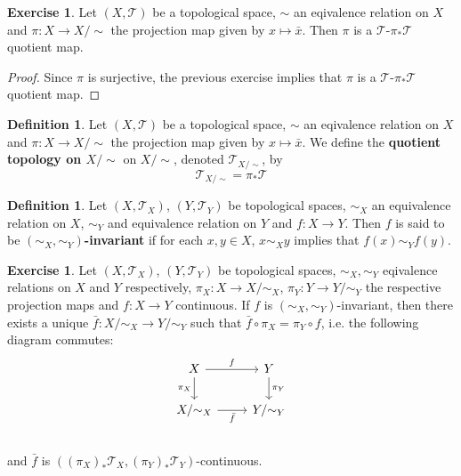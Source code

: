 \documentclass[12pt]{amsart}
\theoremstyle{definition}
\newtheorem{defn}[definition]{Definition}
\newtheorem{ex}[definition]{Exercise}
\newcommand{\MT}{\mathcal{T}}
\newcommand{\tbf}[1]{\textbf{#1}}
\DeclareMathOperator*{\0}{\mbf{0}}
\DeclareMathOperator*{\1}{\mbf{1}}
\newcommand{\lex}[1]{\label{ex:#1}}
\begin{document}
	
	\begin{ex} \lex{34008}
	Let $(X, \MT)$ be a topological space, $\sim$ an eqivalence relation on $X$ and $\pi:X \rightarrow X/\sim$ the projection map given by $x \mapsto \bar{x}$. Then $\pi$ is a $\MT$-$\pi_*\MT$ quotient map. 
	\end{ex}
	
	\begin{proof}
	Since $\pi$ is surjective, the previous exercise implies that $\pi$ is a $\MT$-$\pi_*\MT$ quotient map. 
	\end{proof}

	\begin{defn}
		Let $(X, \MT)$ be a topological space, $\sim$ an eqivalence relation on $X$ and $\pi:X \rightarrow X/\sim$ the projection map given by $x \mapsto \bar{x}$. We define the \tbf{quotient topology on $X / \sim$} on $X/ \sim$, denoted $\MT_{X/ \sim}$, by $$\MT_{X/ \sim} = \pi_{*}\MT$$
	\end{defn}

	\begin{defn}
		Let $(X, \MT_X)$, $(Y, \MT_Y)$ be topological spaces, $\sim_X$ an equivalence relation on $X$, $\sim_Y$ and equivalence relation on $Y$ and $f : X \rightarrow Y $. Then $f$ is said to be \tbf{$(\sim_X, \sim_Y)$-invariant} if for each $x, y \in X$, $x \sim_X y$ implies that $f(x) \sim_Y f(y)$.
	\end{defn}
	
	\begin{ex} \lex{34008}
	Let $(X, \MT_X)$, $(Y, \MT_Y)$ be topological spaces, $\sim_X, \sim_Y$ eqivalence relations on $X$ and $Y$ respectively, $\pi_X:X \rightarrow X/\sim_X$, $\pi_Y:Y \rightarrow Y/\sim_Y$ the respective projection maps and $f:X \rightarrow Y$ continuous. If $f$ is $(\sim_X, \sim_Y)$-invariant, then there exists a unique $\bar{f}:X / {\sim}_X \rightarrow Y/ {\sim_Y}$ such that $ \bar{f} \circ \pi_X = \pi_Y \circ f$, i.e. the following diagram commutes:
	\[ 
	\begin{tikzcd}
		X  \arrow[r, "f"]  \arrow[d, "\pi_X"']  & Y   \arrow[d, "\pi_Y"]\\
		X/ {\sim_X} \arrow[r, "\bar{f}"'] &  Y / {\sim_Y} \\
	\end{tikzcd}
	\]
	and $\bar{f}$ is $((\pi_X)_*\MT_X, (\pi_Y)_*\MT_Y)$-continuous.
	\end{ex}
	
\end{document}
